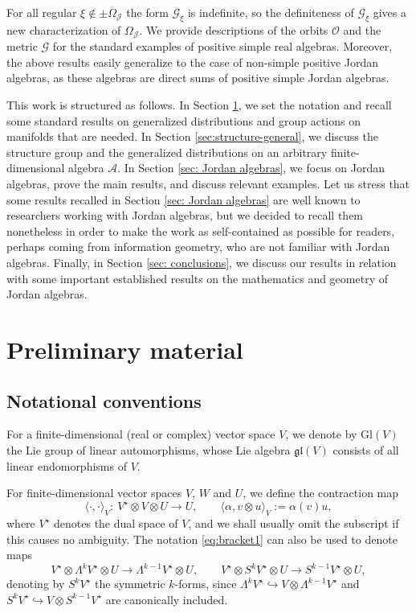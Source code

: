 \documentclass[10pt,a4paper]{amsart}
\numberwithin{equation}{section}
\newcommand{\be}{\begin{equation}}
\newcommand{\ee}{\end{equation}}
\newcommand{\ocal}{\mathcal{O}}
\newcommand{\Jcal}{\mathcal{J}}
\newcommand{\Gl}{{\mathrm{Gl}}}
\newcommand{\gl}{{\mathfrak{gl}}}
\newcommand{\cA}{\mathcal{A}}
\newcommand{\Gcal}{\mathcal{G}}
\begin{document}
For all regular $\xi \notin \pm \overline{\Omega}_\Jcal$ the form $\Gcal_\xi$ is indefinite, so the definiteness of $\Gcal_\xi$ gives a new characterization of $\Omega_\Jcal$.
We provide descriptions of the orbits $\ocal$ and the metric $\Gcal$ for the standard examples of positive simple real algebras. Moreover, the above results easily generalize to the case of non-simple positive Jordan algebras, as these algebras are direct sums of positive simple Jordan algebras.

This work is structured as follows.
In Section \ref{sec:prelim}, we set the notation and recall some standard results on generalized distributions and group actions on manifolds that are needed.
In Section \ref{sec:structure-general}, we discuss the structure group and the generalized distributions on an arbitrary finite-dimensional algebra $\cA$.
In Section \ref{sec: Jordan algebras}, we focus on Jordan algebras, prove the main results, and discuss relevant examples.
Let us stress that some results recalled in Section \ref{sec: Jordan algebras} are well known to researchers working with Jordan algebras, but we decided to recall them nonetheless in order to make the work as self-contained
as possible for readers, perhaps coming from information geometry, who are not familiar with Jordan algebras.
Finally, in Section \ref{sec: conclusions}, we discuss our results in relation with some important established results on the mathematics and geometry of Jordan algebras.


\section{Preliminary material} \label{sec:prelim}




\subsection{Notational conventions} \label{sec:notation}


For a finite-dimensional (real or complex) vector space $V$, we denote by $\Gl(V)$ the Lie group of linear automorphisms, whose Lie algebra $\gl(V)$ consists of all linear endomorphisms of $V$.

For finite-dimensional vector spaces $V$, $W$ and $U$, we define the contraction map
\be \label{eq:bracket1}
\langle \cdot, \cdot \rangle_V\colon\ V^\star \otimes V \otimes U \longrightarrow U, \qquad \langle \alpha, v \otimes u \rangle_V := \alpha(v) u,
\ee
where $V^\star$ denotes the dual space of $V$, and we shall usually omit the subscript if this causes no ambiguity. The notation \eqref{eq:bracket1} can also be used to denote maps
\[
V^\star \otimes \Lambda^k V^\star \otimes U \longrightarrow \Lambda^{k-1} V^\star \otimes U, \qquad V^\star \otimes S^k V^\star \otimes U \longrightarrow S^{k-1} V^\star \otimes U,
\]
denoting by $S^k V^\star$ the symmetric $k$-forms, since $\Lambda^k V^\star \hookrightarrow V \otimes \Lambda^{k-1} V^\star$ and $S^k V^\star \hookrightarrow V \otimes S^{k-1} V^\star$ are canonically included.
\end{document}
